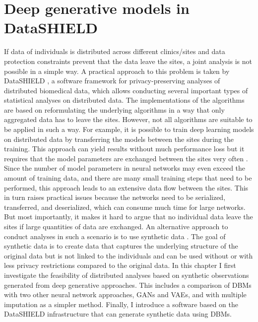 \documentclass[12pt]{article}
\begin{document}


\clearpage
\FloatBarrier
\section{Deep generative models in DataSHIELD}\label{deepgends}

If data of individuals is distributed across different clinics/sites and data protection constraints prevent that the data leave the sites, a joint analysis is not possible in a simple way. 
A practical approach to this problem is taken by DataSHIELD \citep{budin-ljosne_datashield}, a software framework for privacy-preserving analyses of distributed biomedical data, which allows conducting several important types of statistical analyses on distributed data.
The implementations of the algorithms are based on reformulating the underlying algorithms in a way that only aggregated data has to leave the sites.
However, not all algorithms are suitable to be applied in such a way.
For example, it is possible to train deep learning models on distributed data by transferring the models between the sites during the training.
This approach can yield results without much  performance loss but it requires that the model parameters are exchanged between the sites very often \citep{chang_distributed}.
Since the number of model parameters in neural networks may even exceed the amount of training data, and there are many small training steps that need to be performed, this approach leads to an extensive data flow between the sites.
This in turn raises practical issues because the networks need to be serialized, transferred, and deserialized, which can consume much time for large networks.
But most importantly, it makes it hard to argue that no individual data leave the sites if large quantities of data are exchanged.
An alternative approach to conduct analyses in such a scenario is to use synthetic data \citep{bonofiglio2020}.
The goal of synthetic data is to create data that captures the underlying structure of the original data but is not linked to the individuals and can be used without or with less privacy restrictions compared to the original data.
In this chapter I first investigate the feasibility of distributed analyses based on synthetic observations generated from deep generative approaches.
This includes a comparison of DBMs with two other neural network approaches, GANs and VAEs, and with multiple imputation as a simpler method.
Finally, I introduce a software based on the DataSHIELD infrastructure that can generate synthetic data using DBMs.
\end{document}
